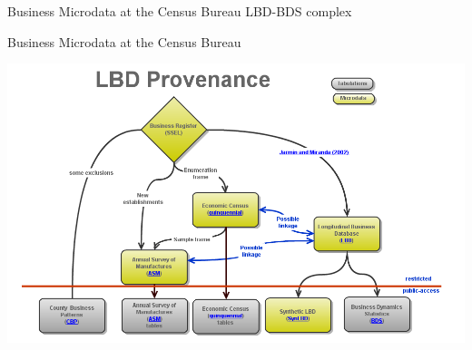 
\begin{frame}{Business Microdata at the Census Bureau}
\vfill
\Huge LBD-BDS complex
\end{frame}

\begin{frame}{Business Microdata at the Census Bureau}
\begin{center}
\includegraphics[height=0.8\textheight]{./LBD_Provenance_v2}
\end{center}
\end{frame}

